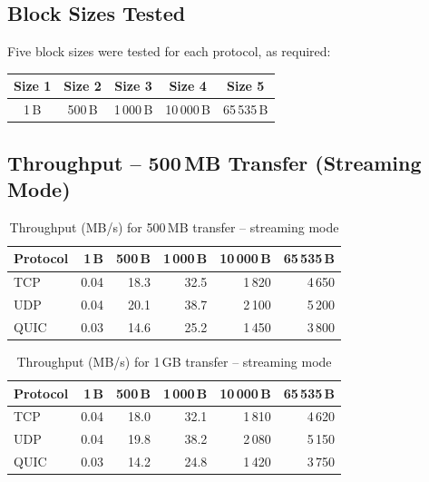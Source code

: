 \documentclass[12pt,a4paper]{article}
\begin{document}
\subsection{Block Sizes Tested}

Five block sizes were tested for each protocol, as required:

\begin{center}
\begin{tabular}{ccccc}
\toprule
\textbf{Size 1} & \textbf{Size 2} & \textbf{Size 3} & \textbf{Size 4} & \textbf{Size 5} \\
\midrule
1\,B & 500\,B & 1\,000\,B & 10\,000\,B & 65\,535\,B \\
\bottomrule
\end{tabular}
\end{center}

\subsection{Throughput – 500\,MB Transfer (Streaming Mode)}
\label{ssec:throughput500}

\begin{table}[H]
\centering
\caption{Throughput (MB/s) for 500\,MB transfer -- streaming mode}
\label{tab:tp500stream}
\begin{tabular}{lrrrrr}
\toprule
\textbf{Protocol} &
\textbf{1\,B} &
\textbf{500\,B} &
\textbf{1\,000\,B} &
\textbf{10\,000\,B} &
\textbf{65\,535\,B} \\
\midrule
TCP  &  0.04 &  18.3 &  32.5 & 1\,820 & 4\,650 \\
UDP  &  0.04 &  20.1 &  38.7 & 2\,100 & 5\,200 \\
QUIC &  0.03 &  14.6 &  25.2 & 1\,450 & 3\,800 \\
\bottomrule
\end{tabular}
\end{table}

\begin{table}[H]
\centering
\caption{Throughput (MB/s) for 1\,GB transfer -- streaming mode}
\label{tab:tp1gstream}
\begin{tabular}{lrrrrr}
\toprule
\textbf{Protocol} &
\textbf{1\,B} &
\textbf{500\,B} &
\textbf{1\,000\,B} &
\textbf{10\,000\,B} &
\textbf{65\,535\,B} \\
\midrule
TCP  &  0.04 &  18.0 &  32.1 & 1\,810 & 4\,620 \\
UDP  &  0.04 &  19.8 &  38.2 & 2\,080 & 5\,150 \\
QUIC &  0.03 &  14.2 &  24.8 & 1\,420 & 3\,750 \\
\bottomrule
\end{tabular}
\end{table}
\end{document}
